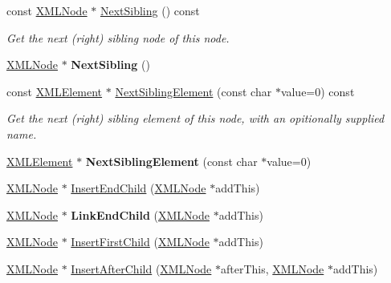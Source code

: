 \begin{DoxyCompactItemize}
const \hyperlink{classtinyxml2_1_1XMLNode}{X\+M\+L\+Node} $\ast$ \hyperlink{classtinyxml2_1_1XMLNode_a79db9ef0fe014d27790f2218b87bcbb5}{Next\+Sibling} () const
\begin{DoxyCompactList}\small\item\em Get the next (right) sibling node of this node. \end{DoxyCompactList}\item 
\mbox{\label{classtinyxml2_1_1XMLNode_aeb7d4dfd8fb924ef86e7cb72183acbac}} 
\hyperlink{classtinyxml2_1_1XMLNode}{X\+M\+L\+Node} $\ast$ {\bfseries Next\+Sibling} ()
\item 
\mbox{\label{classtinyxml2_1_1XMLNode_a4691e8feb9cfc7dbf12a8a4e54f20d06}} 
const \hyperlink{classtinyxml2_1_1XMLElement}{X\+M\+L\+Element} $\ast$ \hyperlink{classtinyxml2_1_1XMLNode_a4691e8feb9cfc7dbf12a8a4e54f20d06}{Next\+Sibling\+Element} (const char $\ast$value=0) const
\begin{DoxyCompactList}\small\item\em Get the next (right) sibling element of this node, with an opitionally supplied name. \end{DoxyCompactList}\item 
\mbox{\label{classtinyxml2_1_1XMLNode_acf735bf653016792522305d8ad4b3029}} 
\hyperlink{classtinyxml2_1_1XMLElement}{X\+M\+L\+Element} $\ast$ {\bfseries Next\+Sibling\+Element} (const char $\ast$value=0)
\item 
\hyperlink{classtinyxml2_1_1XMLNode}{X\+M\+L\+Node} $\ast$ \hyperlink{classtinyxml2_1_1XMLNode_ae3b422e98914d6002ca99bb1d2837103}{Insert\+End\+Child} (\hyperlink{classtinyxml2_1_1XMLNode}{X\+M\+L\+Node} $\ast$add\+This)
\item 
\mbox{\label{classtinyxml2_1_1XMLNode_a663e3a5a378169fd477378f4d17a7649}} 
\hyperlink{classtinyxml2_1_1XMLNode}{X\+M\+L\+Node} $\ast$ {\bfseries Link\+End\+Child} (\hyperlink{classtinyxml2_1_1XMLNode}{X\+M\+L\+Node} $\ast$add\+This)
\item 
\hyperlink{classtinyxml2_1_1XMLNode}{X\+M\+L\+Node} $\ast$ \hyperlink{classtinyxml2_1_1XMLNode_ac609a8f3ea949027f439280c640bbaf2}{Insert\+First\+Child} (\hyperlink{classtinyxml2_1_1XMLNode}{X\+M\+L\+Node} $\ast$add\+This)
\item 
\hyperlink{classtinyxml2_1_1XMLNode}{X\+M\+L\+Node} $\ast$ \hyperlink{classtinyxml2_1_1XMLNode_a9275138a1b8dd5d8e2c26789bdc23ac8}{Insert\+After\+Child} (\hyperlink{classtinyxml2_1_1XMLNode}{X\+M\+L\+Node} $\ast$after\+This, \hyperlink{classtinyxml2_1_1XMLNode}{X\+M\+L\+Node} $\ast$add\+This)

\end{DoxyCompactItemize}
